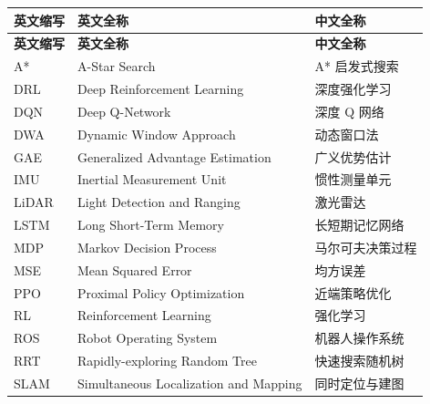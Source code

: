 \cleardoublepage
{}
\begin{center}
    \begin{longtable}{m{2cm}m{8cm}m{5cm}}
        \toprule
        \textbf{英文缩写} & \textbf{英文全称} & \textbf{中文全称}\\
        \midrule
        \endfirsthead
        \toprule
        \textbf{英文缩写} & \textbf{英文全称} & \textbf{中文全称}\\
        \midrule
        \endhead
        \bottomrule
        \endfoot
        \bottomrule
        \endlastfoot
        A*   & A-Star Search                     & A* 启发式搜索 \\
        DRL  & Deep Reinforcement Learning       & 深度强化学习 \\
        DQN  & Deep Q-Network                    & 深度 Q 网络 \\
        DWA  & Dynamic Window Approach           & 动态窗口法 \\
        GAE  & Generalized Advantage Estimation & 广义优势估计 \\
        IMU  & Inertial Measurement Unit         & 惯性测量单元 \\
        LiDAR & Light Detection and Ranging      & 激光雷达 \\
        LSTM & Long Short-Term Memory           & 长短期记忆网络 \\
        MDP  & Markov Decision Process          & 马尔可夫决策过程 \\
        MSE  & Mean Squared Error               & 均方误差 \\
        PPO  & Proximal Policy Optimization     & 近端策略优化 \\
        RL   & Reinforcement Learning           & 强化学习 \\
        ROS  & Robot Operating System           & 机器人操作系统 \\
        RRT  & Rapidly-exploring Random Tree    & 快速搜索随机树 \\
        SLAM & Simultaneous Localization and Mapping & 同时定位与建图 \\
    \end{longtable}
\end{center}
